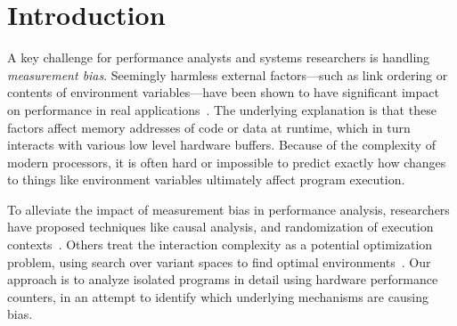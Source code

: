 \documentclass[10pt, conference, compsocconf]{IEEEtran}
\begin{document}







\section{Introduction}
A key challenge for performance analysts and systems researchers is handling \emph{measurement bias}.
Seemingly harmless external factors---such as link ordering or contents of environment variables---have been shown to have significant impact on performance in real applications~\cite{Mytkowicz:2009:WrongData}.
The underlying explanation is that these factors affect memory addresses of code or data at runtime, which in turn interacts with various low level hardware buffers.
Because of the complexity of modern processors, it is often hard or impossible to predict exactly how changes to things like environment variables ultimately affect program execution.

To alleviate the impact of measurement bias in performance analysis, researchers have proposed techniques like causal analysis, and randomization of execution contexts~\cite{Mytkowicz:2008:OE&MB}.
Others treat the interaction complexity as a potential optimization problem, using search over variant spaces to find optimal environments~\cite{Knights:2009:BlindOpt}.
Our approach is to analyze isolated programs in detail using hardware performance counters, in an attempt to identify which underlying mechanisms are causing bias.
\end{document}
